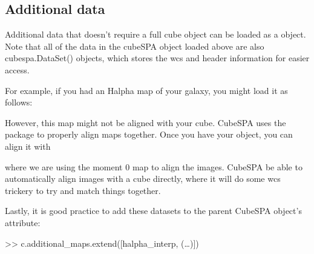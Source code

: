 \documentclass[letterpaper,10pt,english]{sphinxmanual}
\begin{document}
\subsection{Additional data}
\label{\detokenize{getting_started:additional-data}}
\sphinxAtStartPar
Additional data that doesn’t require a full cube object can be loaded as a  object.
Note that all of the data in the cubeSPA object loaded above are also cubespa.DataSet() objects, which stores
the wcs and header information for easier access.

\sphinxAtStartPar
For example, if you had an H\sphinxhyphen{}alpha map of your galaxy, you might load it as follows:

\begin{sphinxVerbatim}[commandchars=\\\{\}]
   
\end{sphinxVerbatim}

\sphinxAtStartPar
However, this map might not be aligned with your cube. CubeSPA uses the 
package to properly align maps together. Once you have your  object, you can align it with

\begin{sphinxVerbatim}[commandchars=\\\{\}]
   
\end{sphinxVerbatim}

\sphinxAtStartPar
where we are using the moment 0 map to align the images. CubeSPA  be able to automatically
align images with a cube directly, where it will do some wcs  trickery to try and match things
together.

\sphinxAtStartPar
Lastly, it is good practice to add these datasets to the parent CubeSPA object’s  attribute:

\sphinxAtStartPar
\textgreater{}\textgreater{} c.additional\_maps.extend({[}halpha\_interp, (…){]})
\end{document}
